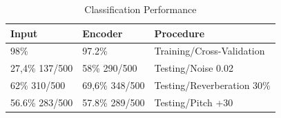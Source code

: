 \documentclass[11pt,a4paper]{article}
\begin{document}
\begin{table}[]
\centering
\caption{Classification Performance}
\label{classification_performances}
\begin{tabular}{|l|l|l|}
\hline
Input          & Encoder        & Procedure                  \\ \hline
98\%           & 97.2\%         & Training/Cross-Validation  \\ \hline
27,4\% 137/500 & 58\% 290/500   & Testing/Noise 0.02         \\ \hline
62\% 310/500   & 69,6\% 348/500 & Testing/Reverberation 30\% \\ \hline
56.6\% 283/500 & 57.8\% 289/500 & Testing/Pitch +30          \\ \hline
\end{tabular}
\end{table}



\end{document}
